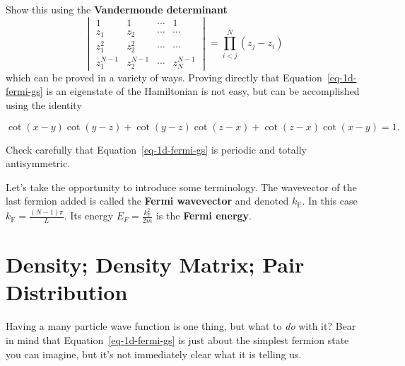 \documentclass[
  a4paper,
]{scrbook}
\begin{document}
\begin{tcolorbox}[enhanced jigsaw, rightrule=.15mm, opacityback=0, bottomtitle=1mm, colbacktitle=quarto-callout-tip-color!10!white, colback=white, toprule=.15mm, titlerule=0mm, arc=.35mm, title=\textcolor{quarto-callout-tip-color}{\faLightbulb}\hspace{0.5em}{Check}, left=2mm, opacitybacktitle=0.6, breakable, leftrule=.75mm, bottomrule=.15mm, colframe=quarto-callout-tip-color-frame, toptitle=1mm, coltitle=black]

Show this using the \textbf{Vandermonde determinant} \[
\begin{vmatrix}
1 & 1 & \cdots & 1 \\
z_{1} &  z_{2} & \cdots & \cdots  \\
z_{1}^{2} & z_{2}^{2} & \cdots & \cdots  \\
z_{1}^{N-1} &  z_{2}^{N-1} & \cdots & z_{N}^{N-1}
\end{vmatrix}=\prod_{i<j}^{N}(z_{j}-z_{i})
\] which can be proved in a variety of ways. Proving directly that
Equation~\ref{eq-1d-fermi-gs} is an eigenstate of the Hamiltonian is not
easy, but can be accomplished using the identity

\[
\begin{equation}
\label{2nd_quant_cotident}
\cot(x-y)\cot(y-z)+\cot(y-z)\cot(z-x)+\cot(z-x)\cot(x-y)=1. \nonumber
\end{equation}
\]

Check carefully that Equation~\ref{eq-1d-fermi-gs} is periodic and
totally antisymmetric.

\end{tcolorbox}

Let's take the opportunity to introduce some terminology. The wavevector
of the last fermion added is called the \textbf{Fermi wavevector} and
denoted \(k_\text{F}\). In this case \(k_\text{F}=\frac{(N-1)\pi}{L}\).
Its energy \(E_{F}=\frac{k_\text{F}^{2}}{2m}\) is the \textbf{Fermi
energy}.

\section{Density; Density Matrix; Pair
Distribution}\label{density-density-matrix-pair-distribution}

Having a many particle wave function is one thing, but what to \emph{do}
with it? Bear in mind that Equation~\ref{eq-1d-fermi-gs} is just about
the simplest fermion state you can imagine, but it's not immediately
clear what it is telling us.
\end{document}
